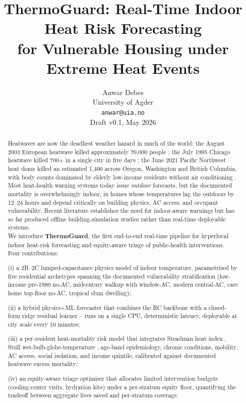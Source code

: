 \documentclass[11pt]{article}
\title{\textbf{ThermoGuard: Real-Time Indoor Heat Risk Forecasting\\for Vulnerable Housing under Extreme Heat Events}}
\author{Anwar Debes\\
University of Agder \\
\texttt{anwar@uia.no}\\
\vspace{0.5em}
\small Draft v0.1, May 2026
}
\date{}
\begin{document}
\maketitle

\begin{abstract}
Heatwaves are now the deadliest weather hazard in much of the world: the August 2003 European heatwave killed approximately 70{,}000 people \citep{poumadere2005french}; the July 1995 Chicago heatwave killed 700+ in a single city in five days \citep{semenza1996chicago}; the June 2021 Pacific Northwest heat dome killed an estimated 1{,}400 across Oregon, Washington and British Columbia, with body counts dominated by elderly low-income residents without air conditioning \citep{philip2021pnw}.  Most heat-health warning systems today issue \emph{outdoor} forecasts, but the documented mortality is overwhelmingly indoor, in homes whose temperatures lag the outdoors by 12--24 hours and depend critically on building physics, AC access, and occupant vulnerability.  Recent literature \citep{iato2025,indoorvulnerability2025,taylor2018london} establishes the need for indoor-aware warnings but has so far produced offline building-simulation studies rather than real-time deployable systems.\\

\noindent We introduce \textbf{ThermoGuard}, the first end-to-end real-time pipeline for hyperlocal indoor heat-risk forecasting and equity-aware triage of public-health interventions.  Four contributions:

(i) a 2R--2C lumped-capacitance physics model of indoor temperature, parametrised by five residential archetypes spanning the documented vulnerability stratification (low-income pre-1980 no-AC, midcentury walkup with window-AC, modern central-AC, care home top-floor no-AC, tropical slum dwelling);

(ii) a hybrid physics+ML forecaster that combines the RC backbone with a closed-form ridge residual learner -- runs on a single CPU, deterministic latency, deployable at city scale every 10 minutes;

(iii) a per-resident heat-mortality risk model that integrates Steadman heat index \citep{steadman1979heatindex}, Stull wet-bulb-globe-temperature \citep{stull2011wetbulb}, age-band epidemiology, chronic conditions, mobility, AC access, social isolation, and income quintile, calibrated against documented heatwave excess mortality;

(iv) an equity-aware triage optimiser that allocates limited intervention budgets (cooling-center visits, hydration kits) under a per-stratum equity floor, quantifying the tradeoff between aggregate lives saved and per-stratum coverage.


\end{abstract}
\end{document}
